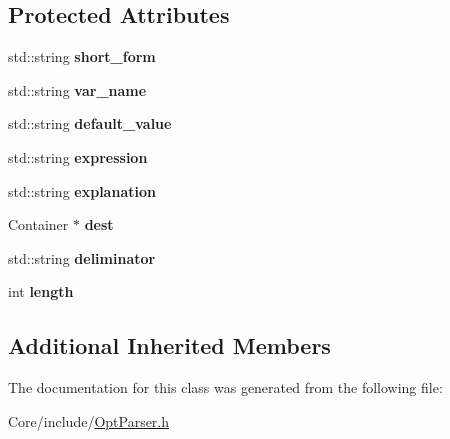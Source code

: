 \subsection*{Protected Attributes}
\begin{DoxyCompactItemize}
\item 
\hypertarget{classskl_1_1_opt_parser_atom_container_a5d33e33b274d5dcd992eea5c697d22db}{}\label{classskl_1_1_opt_parser_atom_container_a5d33e33b274d5dcd992eea5c697d22db} 
std\+::string {\bfseries short\+\_\+form}
\item 
\hypertarget{classskl_1_1_opt_parser_atom_container_a23b8ab845d674477c4e246096c205e42}{}\label{classskl_1_1_opt_parser_atom_container_a23b8ab845d674477c4e246096c205e42} 
std\+::string {\bfseries var\+\_\+name}
\item 
\hypertarget{classskl_1_1_opt_parser_atom_container_a2f0e19983f3d60b3692fee7efa2e34ad}{}\label{classskl_1_1_opt_parser_atom_container_a2f0e19983f3d60b3692fee7efa2e34ad} 
std\+::string {\bfseries default\+\_\+value}
\item 
\hypertarget{classskl_1_1_opt_parser_atom_container_a4e79b705199c2e715b8f7329d9979813}{}\label{classskl_1_1_opt_parser_atom_container_a4e79b705199c2e715b8f7329d9979813} 
std\+::string {\bfseries expression}
\item 
\hypertarget{classskl_1_1_opt_parser_atom_container_ad7c55f9221f17b5f9c8f53d62237425f}{}\label{classskl_1_1_opt_parser_atom_container_ad7c55f9221f17b5f9c8f53d62237425f} 
std\+::string {\bfseries explanation}
\item 
\hypertarget{classskl_1_1_opt_parser_atom_container_ae0b8d86db2a02d66b903f159268ab4ac}{}\label{classskl_1_1_opt_parser_atom_container_ae0b8d86db2a02d66b903f159268ab4ac} 
Container $\ast$ {\bfseries dest}
\item 
\hypertarget{classskl_1_1_opt_parser_atom_container_a1073f927eb5201a93888612088bb3e08}{}\label{classskl_1_1_opt_parser_atom_container_a1073f927eb5201a93888612088bb3e08} 
std\+::string {\bfseries deliminator}
\item 
\hypertarget{classskl_1_1_opt_parser_atom_container_ae8da8fced77c408c406fd754bb374b1e}{}\label{classskl_1_1_opt_parser_atom_container_ae8da8fced77c408c406fd754bb374b1e} 
int {\bfseries length}
\end{DoxyCompactItemize}
\subsection*{Additional Inherited Members}


The documentation for this class was generated from the following file\+:\begin{DoxyCompactItemize}
\item 
Core/include/\hyperlink{_opt_parser_8h}{Opt\+Parser.\+h}\end{DoxyCompactItemize}
